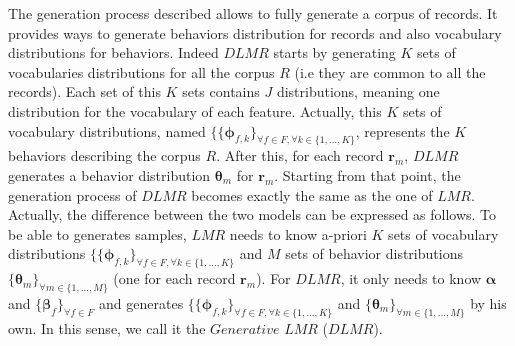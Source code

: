 The generation process described allows to fully generate a corpus of records. It provides ways to generate behaviors distribution for records and also vocabulary distributions for behaviors. Indeed $DLMR$ starts by generating $K$ sets of vocabularies distributions for all the corpus $R$ (i.e they are common to all the records). Each set of this $K$ sets contains $J$ distributions, meaning one distribution for the vocabulary of each feature. Actually, this $K$ sets of vocabulary distributions, named $\{\{\boldsymbol{\phi }_{f,k}\}_{\forall f \in F, \forall k\in\{1,...,K\}}$, represents the $K$ behaviors describing the corpus $R$. After this, for each record $\mathbf{r}_{m}$, $DLMR$ generates a behavior distribution $\boldsymbol{\theta}_{m}$ for $\mathbf{r}_{m}$. Starting from that point, the generation process of $DLMR$ becomes exactly the same as the one of $LMR$. Actually, the difference between the two models can be expressed as follows. To be able to generates samples, $LMR$ needs to know a-priori $K$ sets of vocabulary distributions $\{\{\boldsymbol{\phi }_{f,k}\}_{\forall f \in F, \forall k\in\{1,...,K\}}$ and $M$ sets of behavior distributions $\{\boldsymbol{\theta}_{m}\}_{\forall m\in \{1,...,M\}}$  (one for each record $\mathbf{r}_{m}$). For $DLMR$, it only needs to know $\boldsymbol{\alpha}$ and $\{\boldsymbol{\beta }_{f}\}_{\forall f\in F}$ and generates $\{\{\boldsymbol{\phi }_{f,k}\}_{\forall f \in F, \forall k\in\{1,...,K\}}$  and $\{\boldsymbol{\theta}_{m}\}_{\forall m\in \{1,...,M\}}$ by his own. In this sense, we call it the $Generative$ $LMR$ ($DLMR$). \par

